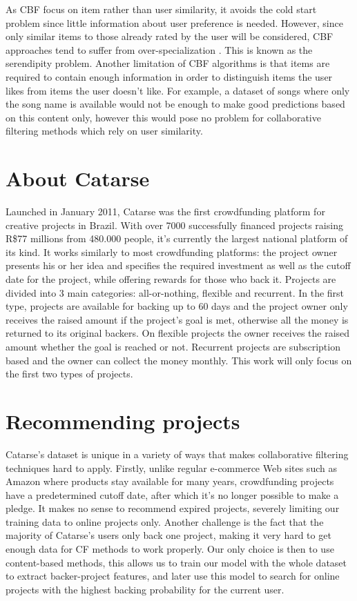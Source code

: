 \documentclass[cic,tc,english]{iiufrgs}
\begin{document}
As CBF focus on item rather than user similarity, it avoids the cold start problem since little information about user preference is needed. However, since only similar items to those already rated by the user will be considered, CBF approaches tend to suffer from over-specialization \cite{Iaquinta2008}. This is known as the serendipity problem. Another limitation of CBF algorithms is that items are required to contain enough information in order to distinguish items the user likes from items the user doesn't like. For example, a dataset of songs where only the song name is available would not be enough to make good predictions based on this content only, however this would pose no problem for collaborative filtering methods which rely on user similarity. 

\chapter{About Catarse}
Launched in January 2011, Catarse was the first crowdfunding platform for creative projects in Brazil. With over 7000 successfully financed projects raising R\$77 millions from 480.000 people, it's currently the largest national platform of its kind. It works similarly to most crowdfunding platforms: the project owner presents his or her idea and specifies the required investment as well as the cutoff date for the project, while offering rewards for those who back it. Projects are divided into 3 main categories: all-or-nothing, flexible and recurrent. In the first type, projects are available for backing up to 60 days and the project owner only receives the raised amount if the project's goal is met, otherwise all the money is returned to its original backers. On flexible projects the owner receives the raised amount whether the goal is reached or not. Recurrent projects are subscription based and the owner can collect the money monthly. This work will only focus on the first two types of projects.

\chapter{Recommending projects}
Catarse's dataset is unique in a variety of ways that makes collaborative filtering techniques hard to apply. Firstly, unlike regular e-commerce Web sites such as Amazon where products stay available for many years, crowdfunding projects have a predetermined cutoff date, after which it's no longer possible to make a pledge. It makes no sense to recommend expired projects, severely limiting our training data to online projects only. Another challenge is the fact that the majority of Catarse's users only back one project, making it very hard to get enough data for CF methods to work properly. Our only choice is then to use content-based methods, this allows us to train our model with the whole dataset to extract backer-project features, and later use this model to search for online projects with the highest backing probability for the current user.
\end{document}
